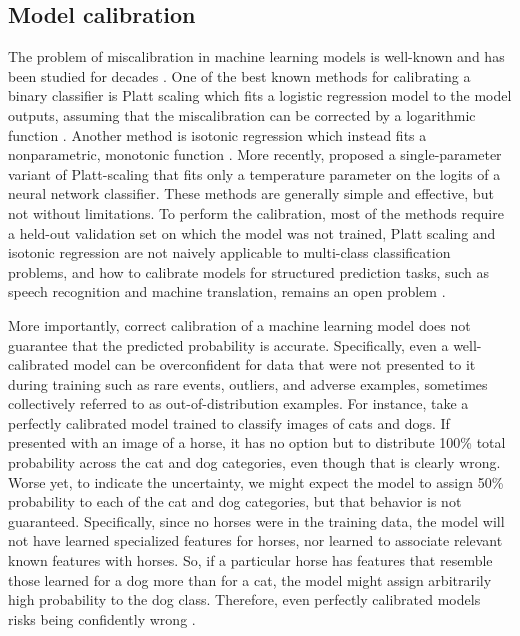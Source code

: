 \subsection{Model calibration} \label{subsec:model-calibration}
% 
The problem of miscalibration in machine learning models is well-known and has been studied for decades \parencite{lewis_sequential_1995, platt_probabilistic_1999, garczarek_classification_2002, zadrozny_transforming_2002, bennett_using_2003, niculescu-mizil_predicting_2005}. One of the best known methods for calibrating a binary classifier is Platt scaling which fits a logistic regression model to the model outputs, assuming that the miscalibration can be corrected by a logarithmic function \parencite{platt_probabilistic_1999}. Another method is isotonic regression which instead fits a nonparametric, monotonic function \parencite{zadrozny_transforming_2002}. 
More recently, \textcite{guo_calibration_2017} proposed a single-parameter variant of Platt-scaling that fits only a temperature parameter on the logits of a neural network classifier. 
These methods are generally simple and effective, but not without limitations. 
To perform the calibration, most of the methods require a held-out validation set on which the model was not trained, Platt scaling and isotonic regression are not naively applicable to multi-class classification problems, and how to calibrate models for structured prediction tasks, such as speech recognition and machine translation, remains an open problem \parencite{astudillo_uncertainty_2010, astudillo_integration_2013, jayashankar_detecting_2020}.

More importantly, correct calibration of a machine learning model does not guarantee that the predicted probability is accurate. 
Specifically, even a well-calibrated model can be overconfident for data that were not presented to it during training such as rare events, outliers, and adverse examples, sometimes collectively referred to as out-of-distribution examples. 
For instance, take a perfectly calibrated model trained to classify images of cats and dogs. If presented with an image of a horse, it has no option but to distribute 100\% total probability across the cat and dog categories, even though that is clearly wrong. 
Worse yet, to indicate the uncertainty, we might expect the model to assign 50\% probability to each of the cat and dog categories, but that behavior is not guaranteed. 
Specifically, since no horses were in the training data, the model will not have learned specialized features for horses, nor learned to associate relevant known features with horses. So, if a particular horse has features that resemble those learned for a dog more than for a cat, the model might assign arbitrarily high probability to the dog class. Therefore, even perfectly calibrated models risks being confidently wrong \parencite{zhou_survey_2022}. 


